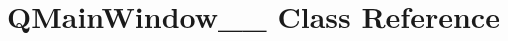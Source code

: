 \hypertarget{classGUI_1_1QtGui_1_1QMainWindow____5}{}\section{Q\+Main\+Window\+\_\+\+\_ Class Reference}
\label{classGUI_1_1QtGui_1_1QMainWindow____5}
